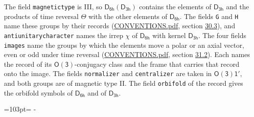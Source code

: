 \documentclass[10pt,a4paper]{article}
\newcommand{\needspace}[1]{\par\penalty-100\begingroup\dimen0=#1\relax\dimen2=\pagegoal
  \advance\dimen2-\pagetotal\ifdim\dimen0>\dimen2\relax\ifdim\dimen2>0pt\vfil\break\fi\fi
  \endgroup}
\numberwithin{equation}{section}
\newcommand{\grp}[1]{\mathsf{#1}}
\begin{document}
The field \texttt{magnetictype} is III, so $\grp{D_{6h}}(\grp{D_{3h}})$ contains the elements of $\grp{D_{3h}}$ and the products of time reversal $\varTheta$ with the other elements of $\grp{D_{6h}}$. The fields \texttt{G} and \texttt{H} name these groups by their records (\href{../../CONVENTIONS.pdf}{CONVENTIONS.pdf}, section \href{../../CONVENTIONS.pdf\#conv.30.3}{30.3}), and \texttt{antiunitarycharacter} names the irrep $\chi$ of $\grp{D_{6h}}$ with kernel $\grp{D_{3h}}$. The four fields \texttt{images} name the groups by which the elements move a polar or an axial vector, even or odd under time reversal (\href{../../CONVENTIONS.pdf}{CONVENTIONS.pdf}, section \href{../../CONVENTIONS.pdf\#conv.31.2}{31.2}). Each names the record of its $\grp{O(3)}$-conjugacy class and the frame that carries that record onto the image. The fields \texttt{normalizer} and \texttt{centralizer} are taken in $\grp{O(3)1'}$, and both groups are of magnetic type II. The field \texttt{orbifold} of the record gives the orbifold symbols of $\grp{D_{6h}}$ and of $\grp{D_{3h}}$.
\needspace{103pt}
\end{document}
